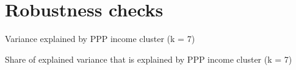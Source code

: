 \documentclass[aspectratio=169,xcolor=dvipsnames, 11pt,mathserif]{beamer}
\begin{document}
\appendix

\section{Robustness checks}

\begin{frame}{Variance explained by PPP income cluster (k = 7) \label{gdp_add}\hyperlink{gdp}{}}
    
\end{frame}

\begin{frame}{Share of explained variance that is explained by PPP income cluster (k = 7) \label{share_gdp_add} \hyperlink{share_gdp}{}} 
    
\end{frame}

\begin{frame}\end{frame} %
\end{document}
